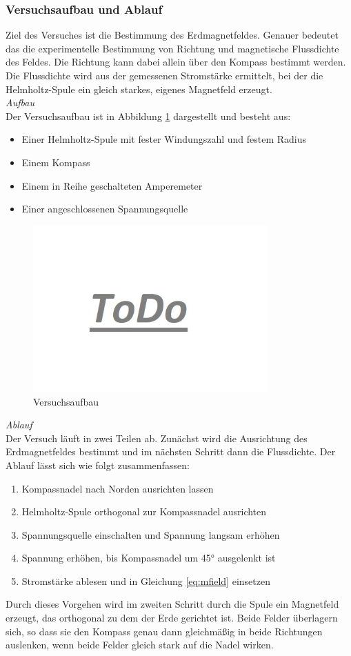 \subsubsection{Versuchsaufbau und Ablauf}
\label{sec-2-2-3}
Ziel des Versuches ist die Bestimmung des Erdmagnetfeldes. Genauer bedeutet das die experimentelle Bestimmung von Richtung und magnetische Flussdichte des Feldes. Die Richtung kann dabei allein über den Kompass bestimmt werden. Die Flussdichte wird aus der gemessenen Stromstärke ermittelt, bei der die Helmholtz-Spule ein gleich starkes, eigenes Magnetfeld erzeugt.\\

\textit{Aufbau}\\
Der Versuchsaufbau ist in Abbildung \ref{img:experiment-devices} dargestellt und besteht aus: 
\begin{itemize}
	\setlength{\itemsep}{-5pt}
	\item Einer Helmholtz-Spule mit fester Windungszahl und festem Radius
	\item Einem Kompass
	\item Einem in Reihe geschalteten Amperemeter
	\item Einer angeschlossenen Spannungsquelle
\end{itemize}

\begin{figure}[h!]
	\centering
	\includegraphics[width=0.8\textwidth]{images/todo.jpg}
	\caption{Versuchsaufbau}
	\label{img:experiment-devices}
\end{figure}

\textit{Ablauf}\\
Der Versuch läuft in zwei Teilen ab. Zunächst wird die Ausrichtung des Erdmagnetfeldes bestimmt und im nächsten Schritt dann die Flussdichte. Der Ablauf lässt sich wie folgt zusammenfassen:
\begin{enumerate}
	\setlength{\itemsep}{-2pt}
	\item Kompassnadel nach Norden ausrichten lassen
	\item Helmholtz-Spule orthogonal zur Kompassnadel ausrichten
	\item Spannungsquelle einschalten und Spannung langsam erhöhen
	\item Spannung erhöhen, bis Kompassnadel um 45° ausgelenkt ist
	\item Stromstärke ablesen und in Gleichung \eqref{eq:mfield} einsetzen
\end{enumerate}

Durch dieses Vorgehen wird im zweiten Schritt durch die Spule ein Magnetfeld erzeugt, das orthogonal zu dem der Erde gerichtet ist. Beide Felder überlagern sich, so dass sie den Kompass genau dann gleichmäßig in beide Richtungen auslenken, wenn beide Felder gleich stark auf die Nadel wirken.
